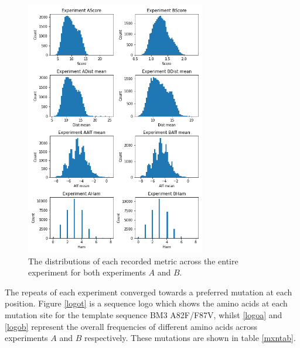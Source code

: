 \documentclass[16pt]{article}
\begin{document}
\begin{figure}
	\begin{center}
		\includegraphics[width=0.7\textwidth]{img/exp-a-b-compr-dists.png}
		\caption{\label{abdistr} The distributions of each recorded metric across the entire experiment for both experiments $A$ and $B$.}
	\end{center}
\end{figure}

The repeats of each experiment converged towards a preferred mutation at each position.
Figure \ref{logot} is a sequence logo which shows the amino acids at each mutation site for the template sequence BM3 A82F/F87V, whilst \ref{logoa} and \ref{logob} represent the overall frequencies of different amino acids across experiments $A$ and $B$ respectively.
These mutations are shown in table \ref{mxntab}.
\end{document}

